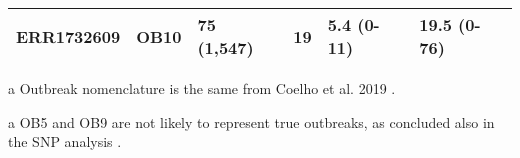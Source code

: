 \begin{table}[h!]
{\begin{threeparttable}[b]
\begin{tabular}{@{}llllll@{}}
        ERR1732609 & OB10 & 75 (1,547) & 19 & 5.4 (0-11) & 19.5 (0-76) \\
        \bottomrule
    \end{tabular}
    \begin{tablenotes}
       \item [a] {\footnotesize Outbreak nomenclature is the same from Coelho et al. 2019 \cite{coelho_genomic_2019}.}
       \item [a] {\footnotesize OB5 and OB9 are not likely to represent true outbreaks, as concluded also in the \ac{SNP} analysis \cite{coelho_genomic_2019}.}
    \end{tablenotes}
    \end{threeparttable}
    }
\end{table}


